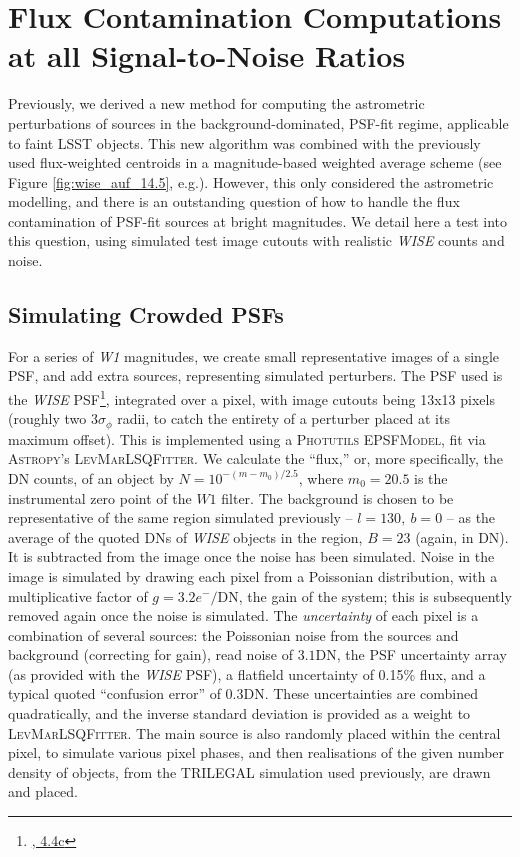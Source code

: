 \documentclass[fleqn,usenatbib]{mnras}
\begin{document}
\section{Flux Contamination Computations at all Signal-to-Noise Ratios}
\label{sec:fluxcontam}
Previously, we derived a new method for computing the astrometric perturbations of sources in the background-dominated, PSF-fit regime, applicable to faint LSST objects.
This new algorithm was combined with the previously used flux-weighted centroids in a magnitude-based weighted average scheme (see Figure \ref{fig:wise_auf_14.5}, e.g.).
However, this only considered the astrometric modelling, and there is an outstanding question of how to handle the flux contamination of PSF-fit sources at bright magnitudes.
We detail here a test into this question, using simulated test image cutouts with realistic \textit{WISE} counts and noise.

\subsection{Simulating Crowded PSFs}
For a series of \textit{W1} magnitudes, we create small representative images of a single PSF, and add extra sources, representing simulated perturbers.
The PSF used is the \textit{WISE} PSF\footnote{\href{http://wise2.ipac.caltech.edu/docs/release/allsky/expsup/data/psf/pass2\_w1\_psf.tar.gz}{\citet{Cutri:2012aa}, 4.4c}}, integrated over a pixel, with image cutouts being 13x13 pixels (roughly two 3$\sigma_\phi$ radii, to catch the entirety of a perturber placed at its maximum offset).
This is implemented using a \textsc{Photutils} \textsc{EPSFModel}, fit via \textsc{Astropy}'s \textsc{LevMarLSQFitter}.
We calculate the ``flux,'' or, more specifically, the DN counts, of an object by $N = 10^{-(m - m_0)/2.5}$, where $m_0 = 20.5$ is the instrumental zero point of the $W1$ filter.
The background is chosen to be representative of the same region simulated previously -- $l = 130,\ b = 0$ -- as the average of the quoted DNs of \textit{WISE} objects in the region, $B = 23$ (again, in DN).
It is subtracted from the image once the noise has been simulated.
Noise in the image is simulated by drawing each pixel from a Poissonian distribution, with a multiplicative factor of $g = 3.2 e^-/\mathrm{DN}$, the gain of the system; this is subsequently removed again once the noise is simulated.
The \textit{uncertainty} of each pixel is a combination of several sources: the Poissonian noise from the sources and background (correcting for gain), read noise of $3.1$DN, the PSF uncertainty array (as provided with the \textit{WISE} PSF), a flatfield uncertainty of 0.15\% flux, and a typical quoted ``confusion error'' of 0.3DN.
These uncertainties are combined quadratically, and the inverse standard deviation is provided as a weight to \textsc{LevMarLSQFitter}.
The main source is also randomly placed within the central pixel, to simulate various pixel phases, and then realisations of the given number density of objects, from the TRILEGAL simulation used previously, are drawn and placed.
\end{document}
